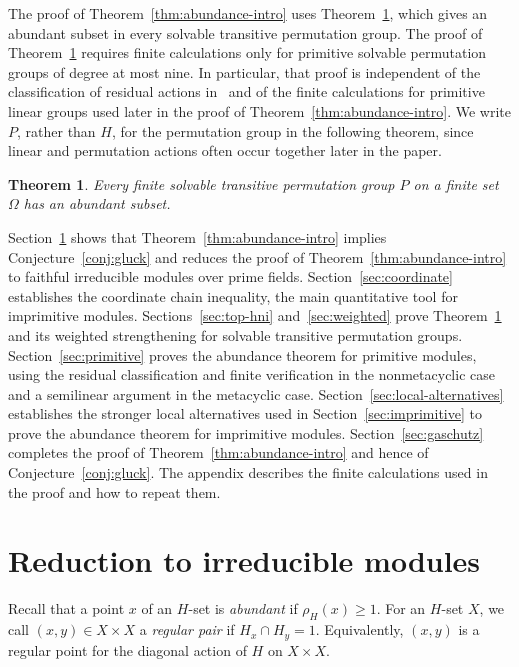 \documentclass[10pt]{amsart}
\newtheorem{theorem}{Theorem}[section]
\theoremstyle{definition}
\renewcommand{\ge}{\geqslant}
\numberwithin{equation}{section}
\numberwithin{table}{section}
\begin{document}
The proof of Theorem~\ref{thm:abundance-intro} uses
Theorem~\ref{thm:top-hni}, which gives an abundant subset in every solvable transitive permutation group. The proof of
Theorem~\ref{thm:top-hni} requires finite calculations only for primitive
solvable permutation groups of degree at most nine. In particular, that proof is independent of the classification of residual actions in~\cite{HY23} and of the finite calculations for primitive linear groups used later in the proof of Theorem~\ref{thm:abundance-intro}. We write $P$, rather than $H$, for the permutation group in the following theorem, since linear and permutation actions often occur together later in the paper.

\begin{theorem}\label{thm:top-hni}
Every finite solvable transitive permutation group $P$ on a finite set $\Omega$ has
an abundant subset.
\end{theorem}

 Section~\ref{sec:reduction} shows that Theorem~\ref{thm:abundance-intro} implies Conjecture~\ref{conj:gluck} and reduces the proof of Theorem~\ref{thm:abundance-intro} to faithful irreducible modules over prime fields. Section~\ref{sec:coordinate}
establishes the coordinate chain inequality, the main quantitative tool for
imprimitive modules. Sections~\ref{sec:top-hni} and~\ref{sec:weighted} prove Theorem~\ref{thm:top-hni} and its weighted strengthening for solvable
transitive permutation groups. Section~\ref{sec:primitive} proves the abundance
theorem for primitive modules, using the residual classification and finite
verification in the nonmetacyclic case and a semilinear argument in the
metacyclic case. Section~\ref{sec:local-alternatives} establishes the stronger
local alternatives used in Section~\ref{sec:imprimitive} to prove the abundance
theorem for imprimitive modules.
Section~\ref{sec:gaschutz} completes the proof of Theorem~\ref{thm:abundance-intro}
and hence of Conjecture~\ref{conj:gluck}. The appendix describes the finite
calculations used in the proof and how to repeat them.

\section{Reduction to irreducible modules}
\label{sec:reduction}

Recall that a point $x$ of an $H$-set is {\it abundant} if $\rho_H(x)\ge1$.
For an $H$-set $X$, we call $(x,y)\in X\times X$ a {\it regular pair} if
$H_x\cap H_y=1$. Equivalently, $(x,y)$ is a regular point for the diagonal
action of $H$ on $X\times X$.
\end{document}
